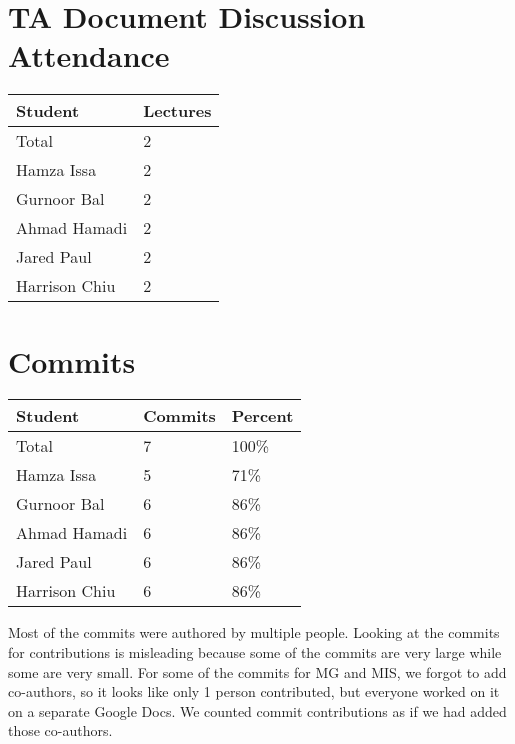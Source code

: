 \documentclass{article}
\begin{document}
\section{TA Document Discussion Attendance}


\begin{table}[H]
\centering
\begin{tabular}{ll}
\toprule
\textbf{Student} & \textbf{Lectures}\\
\midrule
Total & 2\\
Hamza Issa & 2\\
Gurnoor Bal & 2\\
Ahmad Hamadi & 2\\
Jared Paul & 2\\
Harrison Chiu & 2\\
\bottomrule
\end{tabular}
\end{table}

\section{Commits}


\begin{table}[H]
\centering
\begin{tabular}{lll}
\toprule
\textbf{Student} & \textbf{Commits} & \textbf{Percent}\\
\midrule
Total & 7 & 100\% \\
Hamza Issa & 5 & 71\%\\
Gurnoor Bal & 6 & 86\%\\
Ahmad Hamadi & 6 & 86\%\\
Jared Paul & 6 & 86\%\\
Harrison Chiu & 6 & 86\%\\
\bottomrule
\end{tabular}
\end{table}

Most of the commits were authored by multiple people. Looking at the commits for contributions is misleading because some of the commits are very large while some are very small. For some of the commits for MG and MIS, we forgot to add co-authors, so it looks like only 1 person contributed, but everyone worked on it on a separate Google Docs. We counted commit contributions as if we had added those co-authors.
\end{document}
